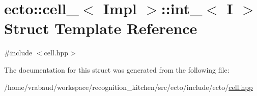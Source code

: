 \hypertarget{structecto_1_1cell___1_1int__}{\section{ecto\-:\-:cell\-\_\-$<$ Impl $>$\-:\-:int\-\_\-$<$ I $>$ Struct Template Reference}
\label{structecto_1_1cell___1_1int__}
}


{\ttfamily \#include $<$cell.\-hpp$>$}



The documentation for this struct was generated from the following file\-:\begin{DoxyCompactItemize}
\item 
/home/vrabaud/workspace/recognition\-\_\-kitchen/src/ecto/include/ecto/\hyperlink{cell_8hpp}{cell.\-hpp}\end{DoxyCompactItemize}
